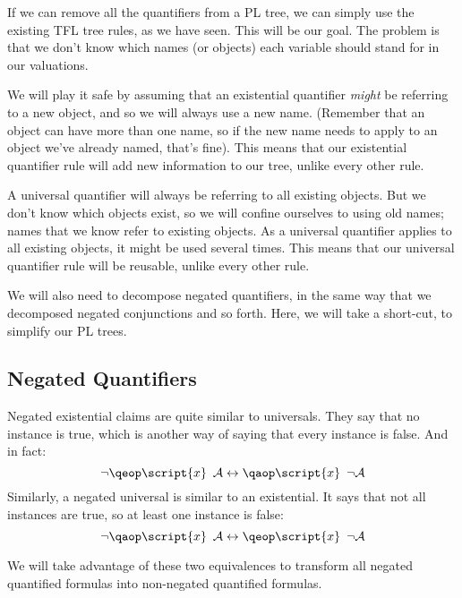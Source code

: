 \documentclass[PHIL101-Textbook.tex]{subfiles}
\begin{document}
If we can remove all the quantifiers from a PL tree, we can simply use the existing TFL tree rules, as we  have seen. This will be our goal. The problem is that we don't know which names (or objects) each variable should stand for in our valuations.

We will play it safe by assuming that an existential quantifier \emph{might} be referring to a new object, and so we will always use a new name. (Remember that an object can have more than one name, so if the new name needs to apply to an object we've already named, that's fine). This means that our existential quantifier rule will add new information to our tree, unlike every other rule.

A universal quantifier will always be referring to all existing objects. But we don't know which objects exist, so we will confine ourselves to using old names; names that we know refer to existing objects. As a universal quantifier applies to all existing objects, it might be used several times. This means that our universal quantifier rule will be reusable, unlike every other rule.

We will also need to decompose negated quantifiers, in the same way that we decomposed negated conjunctions and so forth. Here, we will take a short-cut, to simplify our PL trees. 



\subsection{Negated Quantifiers}

Negated existential claims are quite similar to universals. They say that no instance is true, which is another way of saying that every instance is false. And in fact: \[\enot\qe \script{x} \ \meta{A} \eiff \qa \script{x}\ \enot\meta{A}\]
\noindent Similarly, a negated universal is similar to an existential. It says that not all instances are true, so at least one instance is false:
\[\enot\qa \script{x}\ \meta{A} \eiff \qe \script{x}\ \enot\meta{A}\]

We will take advantage of these two equivalences to transform all negated quantified formulas into non-negated quantified formulas.

\end{document}
